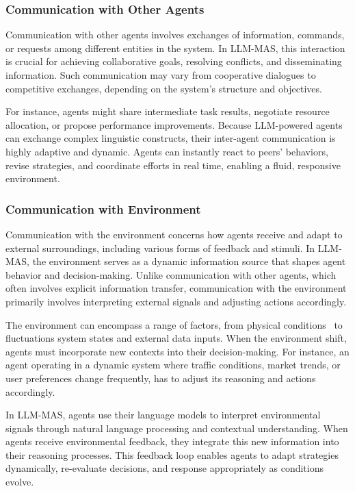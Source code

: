 \subsubsection{Communication with Other Agents}
Communication with other agents involves exchanges of information, commands, or requests among different entities in the system. In LLM-MAS, this interaction is crucial for achieving collaborative goals, resolving conflicts, and disseminating information. Such communication may vary from cooperative dialogues to competitive exchanges, depending on the system’s structure and objectives.

For instance, agents might share intermediate task results, negotiate resource allocation, or propose performance improvements.  Because LLM-powered agents can exchange complex linguistic constructs, their inter-agent communication is highly adaptive and dynamic. Agents can instantly react to peers’ behaviors, revise strategies, and coordinate efforts in real time, enabling a fluid, responsive environment.

\subsubsection{Communication with Environment}
Communication with the environment concerns how agents receive and adapt to external surroundings, including various forms of feedback and stimuli. In LLM-MAS, the environment serves as a dynamic information source that shapes agent behavior and decision-making. Unlike communication with other agents, which often involves explicit information transfer, communication with the environment primarily involves interpreting external signals and adjusting actions accordingly.

The environment can encompass a range of factors, from physical conditions~\cite{embodied_agents} to fluctuations system states and external data inputs. When the environment shift, agents must incorporate new contexts into their decision-making. For instance, an agent operating in a dynamic system where traffic conditions, market trends, or user preferences change frequently, has to adjust its reasoning and actions accordingly.

In LLM-MAS, agents use their language models to interpret environmental signals through natural language processing and contextual understanding. When agents receive environmental feedback, they integrate this new information into their reasoning processes. This feedback loop enables agents to adapt strategies dynamically, re-evaluate decisions, and response appropriately as conditions evolve.


